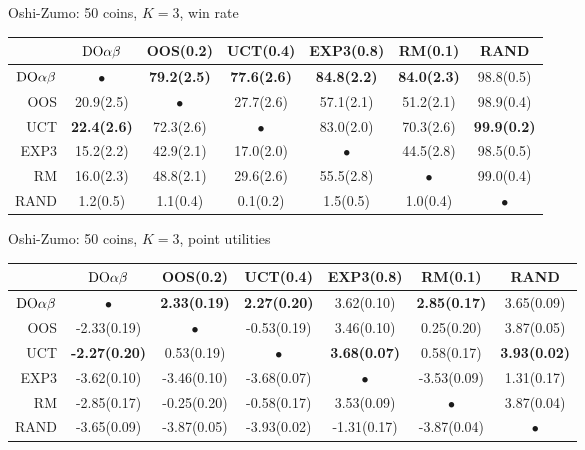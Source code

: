 \begin{table}[t!]
\centering
\begin{scriptsize}

Oshi-Zumo: 50 coins, $K=3$, win rate
\begin{tabular}{|r|cccccc|}\hline
&$\textrm{DO}\alpha\beta$&OOS(0.2)&UCT(0.4)&EXP3(0.8)&RM(0.1)&RAND\\\hline
$\textrm{DO}\alpha\beta$&$\bullet$&\textbf{79.2(2.5)}&\textbf{77.6(2.6)}&\textbf{84.8(2.2)}&\textbf{84.0(2.3)}&98.8(0.5)\\
OOS&20.9(2.5)&$\bullet$&27.7(2.6)&57.1(2.1)&51.2(2.1)&98.9(0.4)\\
UCT&\textbf{22.4(2.6)}&72.3(2.6)&$\bullet$&83.0(2.0)&70.3(2.6)&\textbf{99.9(0.2)}\\
EXP3&15.2(2.2)&42.9(2.1)&17.0(2.0)&$\bullet$&44.5(2.8)&98.5(0.5)\\
RM&16.0(2.3)&48.8(2.1)&29.6(2.6)&55.5(2.8)&$\bullet$&99.0(0.4)\\
RAND&1.2(0.5)&1.1(0.4)&0.1(0.2)&1.5(0.5)&1.0(0.4)&$\bullet$\\
\hline
\end{tabular}

Oshi-Zumo: 50 coins, $K=3$, point utilities
\begin{tabular}{|r|cccccc|}\hline
&$\textrm{DO}\alpha\beta$&OOS(0.2)&UCT(0.4)&EXP3(0.8)&RM(0.1)&RAND\\\hline
$\textrm{DO}\alpha\beta$&$\bullet$&\textbf{2.33(0.19)}&\textbf{2.27(0.20)}&3.62(0.10)&\textbf{2.85(0.17)}&3.65(0.09)\\
OOS&-2.33(0.19)&$\bullet$&-0.53(0.19)&3.46(0.10)&0.25(0.20)&3.87(0.05)\\
UCT&\textbf{-2.27(0.20)}&0.53(0.19)&$\bullet$&\textbf{3.68(0.07)}&0.58(0.17)&\textbf{3.93(0.02)}\\
EXP3&-3.62(0.10)&-3.46(0.10)&-3.68(0.07)&$\bullet$&-3.53(0.09)&1.31(0.17)\\
RM&-2.85(0.17)&-0.25(0.20)&-0.58(0.17)&3.53(0.09)&$\bullet$&3.87(0.04)\\
RAND&-3.65(0.09)&-3.87(0.05)&-3.93(0.02)&-1.31(0.17)&-3.87(0.04)&$\bullet$\\
\hline
\end{tabular}


\end{scriptsize}
\end{table}
